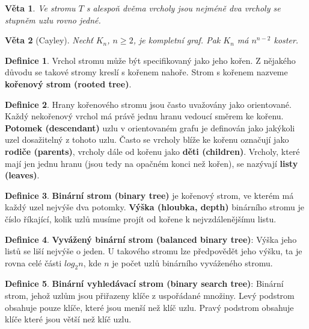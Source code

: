 \documentclass[a4]{report}
\newtheorem{theorem}{Věta}
\theoremstyle{definition}
\newtheorem{definition}{Definice}[section]
\begin{document}
\begin{theorem}
Ve stromu $T$ s alespoň dvěma vrcholy jsou nejméně dva vrcholy se stupněm uzlu rovno jedné.
\end{theorem}

\begin{theorem}[Cayley]
Nechť $K_n$, $n \geq 2$, je kompletní graf. Pak $K_n$ má $n^{n-2}$ koster.
\end{theorem}

\begin{definition}
Vrchol stromu může být specifikovaný jako jeho kořen. Z nějakého důvodu se takové stromy kreslí s kořenem nahoře. Strom s kořenem nazveme \textbf{kořenový strom (rooted tree)}.
\end{definition}

\begin{definition}
Hrany kořenového stromu jsou často uvažovány jako orientované. Každý nekořenový vrchol má právě jednu hranu vedoucí směrem ke kořenu. \textbf{Potomek (descendant)} uzlu v orientovaném grafu je definován jako jakýkoli uzel dosažitelný z tohoto uzlu. Často se vrcholy blíže ke kořenu označují jako \textbf{rodiče (parents)}, vrcholy dále od kořenu jako \textbf{děti (children)}. Vrcholy, které mají jen jednu hranu (jsou tedy na opačném konci než kořen), se nazývají \textbf{listy (leaves)}.
\end{definition}

\begin{definition}
\textbf{Binární strom (binary tree)} je kořenový strom, ve kterém má každý uzel nejvýše dva potomky. \textbf{Výška (hloubka, depth)} binárního stromu je číslo říkající, kolik uzlů musíme projít od kořene k nejvzdálenějšímu listu.
\end{definition}

\begin{definition}
\textbf{Vyvážený binární strom (balanced binary tree)}: Výška jeho listů se liší nejvýše o jeden. U takového stromu lze předpovědět jeho výšku, ta je rovna celé části $log_2 n$, kde $n$ je počet uzlů binárního vyváženého stromu.
\end{definition}

\begin{definition}
\textbf{Binární vyhledávací strom (binary search tree)}: Binární strom, jehož uzlům jsou přiřazeny klíče z uspořádané množiny. Levý podstrom obsahuje pouze klíče, které jsou menší než klíč uzlu. Pravý podstrom obsahuje klíče které jsou větší než klíč uzlu.
\end{definition}
\end{document}
